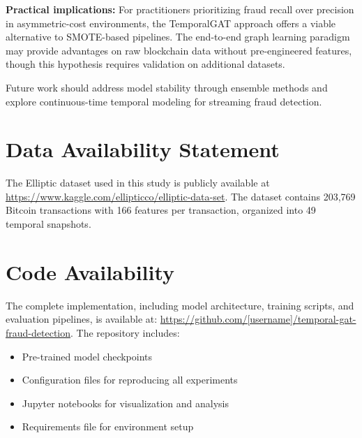\documentclass[12pt,a4paper]{article}
\begin{document}
\textbf{Practical implications:} For practitioners prioritizing fraud recall over precision in asymmetric-cost environments, the TemporalGAT approach offers a viable alternative to SMOTE-based pipelines. The end-to-end graph learning paradigm may provide advantages on raw blockchain data without pre-engineered features, though this hypothesis requires validation on additional datasets.

Future work should address model stability through ensemble methods and explore continuous-time temporal modeling for streaming fraud detection.

\section*{Data Availability Statement}
The Elliptic dataset used in this study is publicly available at \url{https://www.kaggle.com/ellipticco/elliptic-data-set}. The dataset contains 203,769 Bitcoin transactions with 166 features per transaction, organized into 49 temporal snapshots.

\section*{Code Availability}
The complete implementation, including model architecture, training scripts, and evaluation pipelines, is available at: \url{https://github.com/[username]/temporal-gat-fraud-detection}. The repository includes:
\begin{itemize}
    \item Pre-trained model checkpoints
    \item Configuration files for reproducing all experiments
    \item Jupyter notebooks for visualization and analysis
    \item Requirements file for environment setup
\end{itemize}




\end{document}
